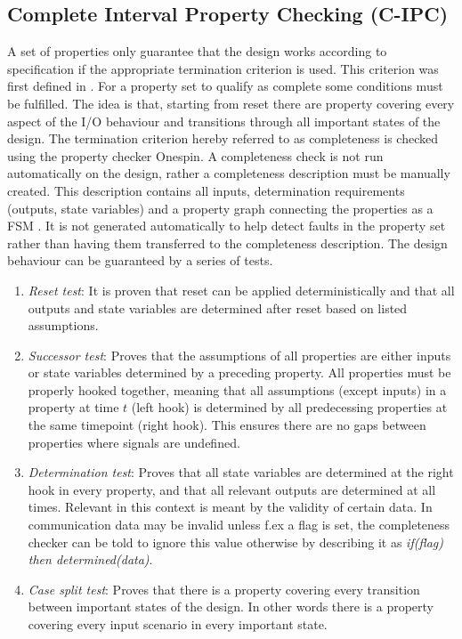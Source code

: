 \subsection{Complete Interval Property Checking (C-IPC)}
\label{subsec:cipc}
A set of properties only guarantee that the design works according to specification if the appropriate termination criterion is used. This criterion was first defined in \cite{bormannbusch}. For a property set to qualify as complete some conditions must be fulfilled. The idea is that, starting from reset there are property  covering every aspect of the I/O behaviour and transitions through all important states of the design. The termination criterion hereby referred to as completeness is checked using the property checker Onespin.   A completeness check is not run automatically on the design, rather a completeness description must be manually created. This description contains all inputs, determination requirements (outputs, state variables) and a property graph connecting the properties as a FSM  . It is not generated automatically to help detect faults in the property set rather than having them transferred to the completeness description. The design behaviour can be guaranteed by a series of tests.
\begin{enumerate}
 \item \textit{Reset test}: It is proven that reset can be applied deterministically and that all outputs and state variables are determined after reset based on listed assumptions.
 \item \textit{Successor test}: Proves that the assumptions of all properties are either inputs or state variables determined by a preceding property. All properties must be properly hooked together, meaning that all assumptions (except inputs) in a property at time $t$ (left hook) is determined by all predecessing properties at the same timepoint (right hook). This ensures there are no gaps between properties where signals are undefined. 
 \item \textit{Determination test}: Proves that all state variables are determined at the right hook in every property, and that all relevant outputs are determined at all times. Relevant in this context is meant by the validity of certain data. In communication data may be invalid unless f.ex a flag is set, the completeness checker can be told to ignore this value otherwise by describing it as \textit{if(flag) then determined(data)}.
 \item \textit{Case split test}: Proves that there is a property covering every transition between important states of the design. In other words there is a property covering every input scenario in every important state. 
\end{enumerate}

